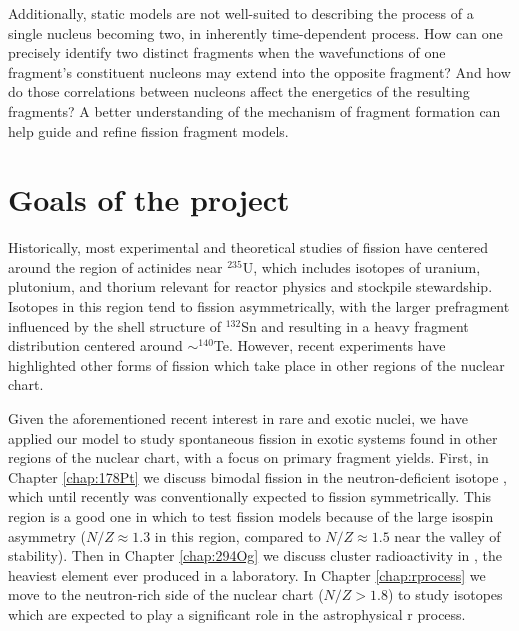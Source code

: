 Additionally, static models are not well-suited to describing the process of a single nucleus becoming two, in inherently time-dependent process. How can one precisely identify two distinct fragments when the wavefunctions of one fragment’s constituent nucleons may extend into the opposite fragment? And how do those correlations between nucleons affect the energetics of the resulting fragments? A better understanding of the mechanism of fragment formation can help guide and refine fission fragment models.


\section{Goals of the project}
Historically, most experimental and theoretical studies of fission have centered around the region of actinides near $^{235}$U, which includes isotopes of uranium, plutonium, and thorium relevant for reactor physics and stockpile stewardship. Isotopes in this region tend to fission asymmetrically, with the larger prefragment influenced by the shell structure of $^{132}$Sn and resulting in a heavy fragment distribution centered around $\sim^{140}$Te. However, recent experiments have highlighted other forms of fission which take place in other regions of the nuclear chart.

Given the aforementioned recent interest in rare and exotic nuclei, we have applied our model to study spontaneous fission in exotic systems found in other regions of the nuclear chart, with a focus on primary fragment yields. First, in Chapter \ref{chap:178Pt} we discuss bimodal fission in the neutron-deficient isotope {\Pt}, which until recently was conventionally expected to fission symmetrically. This region is a good one in which to test fission models because of the large isospin asymmetry ($N/Z\approx1.3$ in this region, compared to $N/Z\approx1.5$ near the valley of stability). Then in Chapter \ref{chap:294Og} we discuss cluster radioactivity in {\Og}, the heaviest element ever produced in a laboratory. In Chapter \ref{chap:rprocess} we move to the neutron-rich side of the nuclear chart ($N/Z>1.8$) to study isotopes which are expected to play a significant role in the astrophysical r process. %


